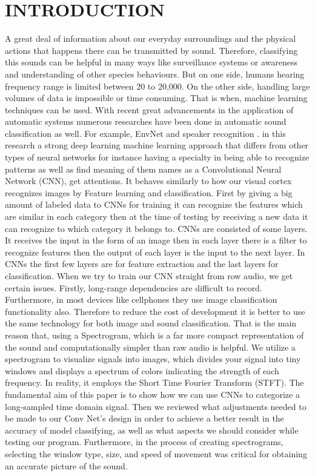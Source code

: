 \documentclass[conference]{IEEEtran}
\begin{document}
\section{INTRODUCTION}
A great deal of information about our everyday surroundings and the physical actions that happens there can be transmitted by sound. Therefore, classifying this sounds can be helpful in many ways like surveillance systems or awareness and understanding of other species behaviours. But on one side, humans hearing frequency range is limited between 20 to 20,000. On the other side, handling large volumes of data is impossible or time consuming. That is when, machine learning techniques can be used. With recent great advancements in the application of automatic systems numerous researches have been done in automatic sound classification as well. For example, EnvNet \cite{b1} and speaker recognition \cite{b2}. in this research a strong deep learning machine learning approach that differs from other types of neural networks for instance having a specialty in being able to recognize patterns as well as find meaning of them names as a Convolutional Neural Network (CNN), get attentions. It behaves similarly to how our visual cortex recognizes images by Feature learning and classification. First by giving a big amount of labeled data to CNNs for training it can recognize the features which are similar in each category then at the time of testing by receiving a new data it can recognize to which category it belongs to. CNNs are consisted of some layers. It receives the input in the form of an image then in each layer there is a filter to recognize features then the output of each layer is the input to the next layer. In CNNs the first few layers are for feature extraction and the last layers for classification. 
When we try to train our CNN straight from row audio, we get certain issues. Firstly, long-range dependencies are difficult to record. Furthermore, in most devices like cellphones they use image classification functionality also. Therefore to reduce the cost of development it is better to use the same technology for both image and sound classification. That is the main reason that, using a Spectrogram, which is a far more compact representation of the sound and computationally simpler than raw audio is helpful. We utilize a spectrogram to visualize signals into images, which divides your signal into tiny windows and displays a spectrum of colors indicating the strength of each frequency. In reality, it employs the Short Time Fourier Transform (STFT). The fundamental aim of this paper is to show how we can use CNNs to categorize a long-sampled time domain signal. Then we reviewed what adjustments needed to be made to our Conv Net's design in order to achieve a better result in the accuracy of model classifying, as well as what aspects we should consider while testing our program. Furthermore, in the process of creating spectrograms, selecting the window type, size, and speed of movement was critical for obtaining an accurate picture of the sound.
\end{document}

